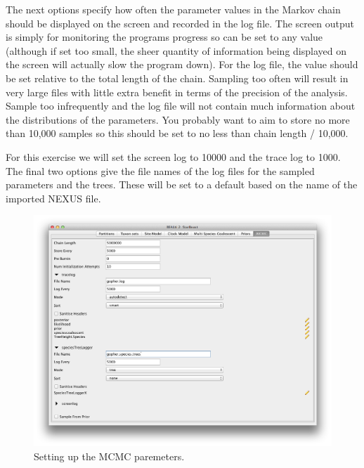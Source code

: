 \documentclass{article}
\begin{document}
The next options specify how often the parameter values in the Markov
chain should be displayed on the screen and recorded in the log file.
The screen output is simply for monitoring the programs progress so
can be set to any value (although if set too small, the sheer quantity
of information being displayed on the screen will actually slow the
program down). For the log file, the value should be set relative
to the total length of the chain. Sampling too often will result in
very large files with little extra benefit in terms of the precision
of the analysis. Sample too infrequently and the log file will not
contain much information about the distributions of the parameters. 
You probably want to aim to store no more than 10,000 samples so this should be
set to no less than chain length / 10,000.

For this exercise we will set the screen log to 10000 and the trace log to 1000. The final two
options give the file names of the log files for the sampled parameters and
the trees. These will be set to a default based on the name of the
imported NEXUS file. 


\begin{figure}
\begin{center}

\includegraphics[scale=0.4]{figures/BEAUti_MCMC}

\end{center}
\caption{\label{fig.MCMC} Setting up the MCMC paremeters.}
\end{figure}
\end{document}

